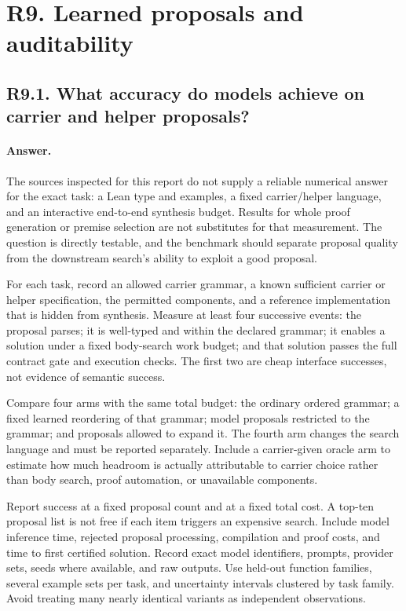 \documentclass[11pt,a4paper]{article}
\newcommand{\answer}{\paragraph{Answer.}}
\theoremstyle{definition}
\theoremstyle{remark}
\begin{document}
\section{R9. Learned proposals and auditability}
\label{sec:r9}

\subsection{R9.1. What accuracy do models achieve on carrier and helper proposals?}
\answer The sources inspected for this report do not supply a reliable numerical
answer for the exact task: a Lean type and examples, a fixed carrier/helper
language, and an interactive end-to-end synthesis budget. Results for whole
proof generation or premise selection are not substitutes for that measurement.
The question is directly testable, and the benchmark should separate proposal
quality from the downstream search's ability to exploit a good proposal.

For each task, record an allowed carrier grammar, a known sufficient carrier or
helper specification, the permitted components, and a reference implementation
that is hidden from synthesis. Measure at least four successive events: the
proposal parses; it is well-typed and within the declared grammar; it enables
a solution under a fixed body-search work budget; and that solution passes the
full contract gate and execution checks. The first two are cheap interface
successes, not evidence of semantic success.

Compare four arms with the same total budget: the ordinary ordered grammar;
a fixed learned reordering of that grammar; model proposals restricted to the
grammar; and proposals allowed to expand it. The fourth arm changes the search
language and must be reported separately. Include a carrier-given oracle arm to
estimate how much headroom is actually attributable to carrier choice rather
than body search, proof automation, or unavailable components.

Report success at a fixed proposal count and at a fixed total cost. A top-ten
proposal list is not free if each item triggers an expensive search. Include
model inference time, rejected proposal processing, compilation and proof
costs, and time to first certified solution. Record exact model identifiers,
prompts, provider sets, seeds where available, and raw outputs. Use held-out
function families, several example sets per task, and uncertainty intervals
clustered by task family. Avoid treating many nearly identical variants as
independent observations.
\end{document}
